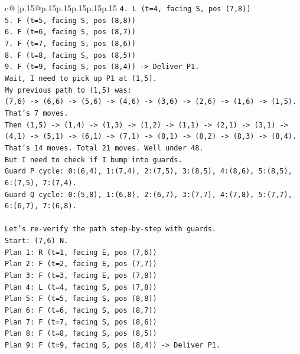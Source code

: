 \documentclass{article}
\begin{document}
{\begin{supertabular}{c@{$\;$}|p{.15\linewidth}@{}p{.15\linewidth}p{.15\linewidth}p{.15\linewidth}p{.15\linewidth}p{.15\linewidth}}
{{{\texttt{4. L (t=4, facing S, pos (7,8))} \\
\texttt{5. F (t=5, facing S, pos (8,8))} \\
\texttt{6. F (t=6, facing S, pos (8,7))} \\
\texttt{7. F (t=7, facing S, pos (8,6))} \\
\texttt{8. F (t=8, facing S, pos (8,5))} \\
\texttt{9. F (t=9, facing S, pos (8,4)) {-}> Deliver P1.} \\
\texttt{Wait, I need to pick up P1 at (1,5).} \\
\texttt{My previous path to (1,5) was:} \\
\texttt{(7,6) {-}> (6,6) {-}> (5,6) {-}> (4,6) {-}> (3,6) {-}> (2,6) {-}> (1,6) {-}> (1,5).} \\
\texttt{That's 7 moves.} \\
\texttt{Then (1,5) {-}> (1,4) {-}> (1,3) {-}> (1,2) {-}> (1,1) {-}> (2,1) {-}> (3,1) {-}> (4,1) {-}> (5,1) {-}> (6,1) {-}> (7,1) {-}> (8,1) {-}> (8,2) {-}> (8,3) {-}> (8,4).} \\
\texttt{That's 14 moves. Total 21 moves. Well under 48.} \\
\texttt{But I need to check if I bump into guards.} \\
\texttt{Guard P cycle: 0:(6,4), 1:(7,4), 2:(7,5), 3:(8,5), 4:(8,6), 5:(8,5), 6:(7,5), 7:(7,4).} \\
\texttt{Guard Q cycle: 0:(5,8), 1:(6,8), 2:(6,7), 3:(7,7), 4:(7,8), 5:(7,7), 6:(6,7), 7:(6,8).} \\
\\ 
\texttt{Let's re{-}verify the path step{-}by{-}step with guards.} \\
\texttt{Start: (7,6) N.} \\
\texttt{Plan 1: R (t=1, facing E, pos (7,6))} \\
\texttt{Plan 2: F (t=2, facing E, pos (7,7))} \\
\texttt{Plan 3: F (t=3, facing E, pos (7,8))} \\
\texttt{Plan 4: L (t=4, facing S, pos (7,8))} \\
\texttt{Plan 5: F (t=5, facing S, pos (8,8))} \\
\texttt{Plan 6: F (t=6, facing S, pos (8,7))} \\
\texttt{Plan 7: F (t=7, facing S, pos (8,6))} \\
\texttt{Plan 8: F (t=8, facing S, pos (8,5))} \\
\texttt{Plan 9: F (t=9, facing S, pos (8,4)) {-}> Deliver P1.} \\
}}}
\end{supertabular}}
\end{document}
